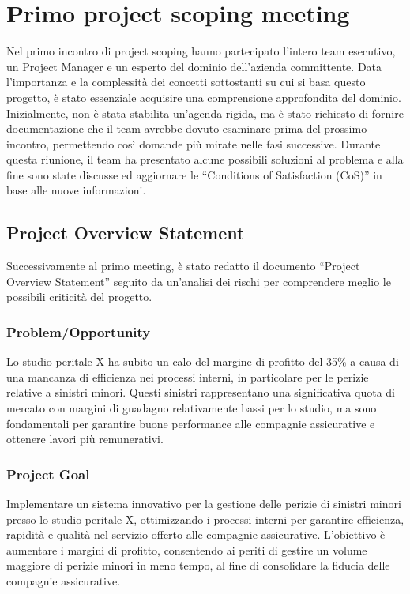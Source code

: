 \documentclass[a4paper,12pt, openright]{report}
\begin{document}
\section{Primo project scoping meeting}
Nel primo incontro di project scoping hanno partecipato l'intero team esecutivo, un Project Manager e un esperto del dominio dell'azienda committente. Data l'importanza e la complessità dei concetti sottostanti su cui si basa questo progetto, è stato essenziale acquisire una comprensione approfondita del dominio. Inizialmente, non è stata stabilita un'agenda rigida, ma è stato richiesto di fornire documentazione che il team avrebbe dovuto esaminare prima del prossimo incontro, permettendo così domande più mirate nelle fasi successive. Durante questa riunione, il team ha presentato alcune possibili soluzioni al problema e alla fine sono state discusse ed aggiornare le ``Conditions of Satisfaction (CoS)'' in base alle nuove informazioni.

\subsection{Project Overview Statement}
Successivamente al primo meeting, è stato redatto il documento ``Project Overview Statement'' seguito da un'analisi dei rischi per comprendere meglio le possibili criticità del progetto.

\subsubsection{Problem/Opportunity}
Lo studio peritale X ha subito un calo del margine di profitto del 35\% a causa di una mancanza di efficienza nei processi interni, in particolare per le perizie relative a sinistri minori. Questi sinistri rappresentano una significativa quota di mercato con margini di guadagno relativamente bassi per lo studio, ma sono fondamentali per garantire buone performance alle compagnie assicurative e ottenere lavori più remunerativi.

\subsubsection{Project Goal}
Implementare un sistema innovativo per la gestione delle perizie di sinistri minori presso lo studio peritale X, ottimizzando i processi interni per garantire efficienza, rapidità e qualità nel servizio offerto alle compagnie assicurative. L'obiettivo è aumentare i margini di profitto, consentendo ai periti di gestire un volume maggiore di perizie minori in meno tempo, al fine di consolidare la fiducia delle compagnie assicurative.
\end{document}
